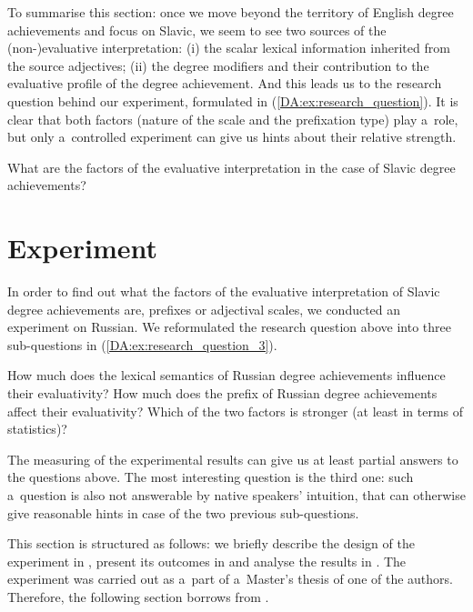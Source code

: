 \documentclass[output=paper]{langscibook}
\begin{document}
To summarise this section: once we move beyond the territory of English degree achievements and focus on Slavic, we seem to see two sources of the \mbox{(non-)eval}\-uative interpretation: (i) the scalar lexical information inherited from the source adjectives; (ii) the degree modifiers and their contribution to the evaluative profile of the degree achievement. And this leads us to the research question behind our experiment, formulated in (\ref{DA:ex:research_question}). It is clear that both factors (nature of the scale and the prefixation type) play a~role, but only a~controlled experiment can give us hints about their relative strength.

\eanoraggedright\label{DA:ex:research_question} What are the factors of the evaluative interpretation in the case of Slavic degree achievements?   
\z

\section{Experiment}\label{DA:sec:Experiment}

In order to find out what the factors of the evaluative interpretation of Slavic degree achievements are, prefixes or adjectival scales, we conducted an experiment on Russian. We reformulated the research question above into three sub-questions in (\ref{DA:ex:research_question_3}).

\eanoraggedright\label{DA:ex:research_question_3}\eanoraggedright How much does the lexical semantics of Russian degree achievements influence their evaluativity?
\ex How much does the prefix of Russian degree achievements affect their evaluativity? 
\ex Which of the two factors is stronger (at least in terms of statistics)?
\z\z

\noindent The measuring of the experimental results can give us at least partial answers to the questions above. The most interesting question is the third one: such a~question is also not answerable by native speakers' intuition, that can otherwise give reasonable hints in case of the two previous sub-questions.

This section is structured as follows: we briefly describe the design of the experiment in , present its outcomes in  and analyse the results in . The experiment was carried out as a~part of a~Master's thesis of one of the authors. Therefore, the following section borrows from \citet{Onoeva2021thesis}. 
\end{document}
